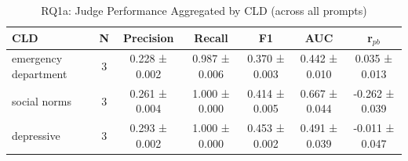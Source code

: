 \begin{table}[htbp]
\centering
\caption{RQ1a: Judge Performance Aggregated by CLD (across all prompts)}
\label{tab:rq1a_by_cld}
\begin{tabular}{lcccccc}
\toprule
\textbf{CLD} & \textbf{N} & \textbf{Precision} & \textbf{Recall} & \textbf{F1} & \textbf{AUC} & \textbf{r$_{pb}$} \\
\midrule
emergency department & 3 & 0.228 ± 0.002 & 0.987 ± 0.006 & 0.370 ± 0.003 & 0.442 ± 0.010 & 0.035 ± 0.013 \\
social norms & 3 & 0.261 ± 0.004 & 1.000 ± 0.000 & 0.414 ± 0.005 & 0.667 ± 0.044 & -0.262 ± 0.039 \\
depressive & 3 & 0.293 ± 0.002 & 1.000 ± 0.000 & 0.453 ± 0.002 & 0.491 ± 0.039 & -0.011 ± 0.047 \\
\bottomrule
\end{tabular}
\end{table}